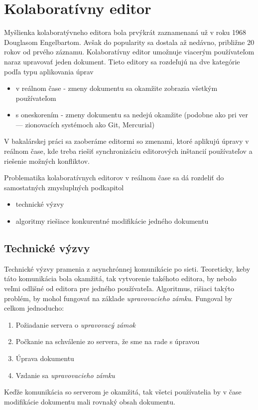 \chapter{Kolaboratívny editor}

\label{kap:zdialtelnost} %

Myšlienka kolaboratývneho editora bola prvýkrát zaznamenaná už v roku 1968 Douglasom Engelbartom. 
Avšak do popularity sa dostala až nedávno, približne 20 rokov od prvého záznamu.
Kolaboratívny editor umožnuje viacerým používateľom naraz upravovať jeden dokument.
Tieto editory sa rozdeľujú na dve kategórie podľa typu aplikovania úprav
\begin{itemize}
  \item v reálnom čase - zmeny dokumentu sa okamžite zobrazia všetkým používateľom
  \item s oneskorením - zmeny dokumentu sa nedejú okamžite (podobne ako pri ver --- zionovacích
  systémoch ako Git, Mercurial)
\end{itemize}
V bakalárskej práci sa zaoberáme editormi so zmenami, ktoré aplikujú úpravy v reálnom čase, kde treba
riešiť synchronizáciu editorových inštancií používateľov a riešenie možných konfliktov.

Problematika kolaboratívnych editorov v reálnom čase sa dá rozdeliť do samostatných zmysluplných 
podkapitol
\begin{itemize}
\item  technické výzvy
\item  algoritmy riešiace konkurentné modifikácie jedného dokumentu
\end{itemize}

\section{Technické výzvy}
Technické výzvy pramenia z asynchrónnej komunikácie po sieti. Teoreticky, keby táto 
komunikácia bola okamžitá, tak vytvorenie takéhoto editora, by nebolo veľmi odlišné od
editora pre jedného používateľa. Algoritmus\label{algo:nesubezne_editovanie}, 
rišiaci takýto problém, by mohol fungovať na základe 
\textit{upravovacieho zámku}. Fungoval by celkom jednoducho:
\begin{enumerate}
  \item Požiadanie servera o \textit{upravovacý zámok}
  \item Počkanie na schválenie zo servera, že sme na rade s úpravou
  \item Úprava dokumentu
  \item Vzdanie sa \textit{upravovacieho zámku}
\end{enumerate}
Keďže komunikácia so serverom je okamžitá, tak všetci používatelia by v čase modifikácie
dokumentu mali rovnaký obsah dokumentu. 

